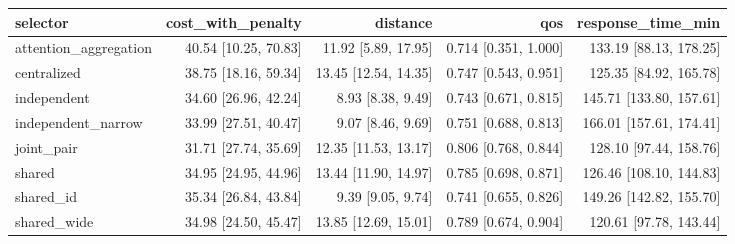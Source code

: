\begin{tabular}{lrrrr}
\toprule
selector & cost\_with\_penalty & distance & qos & response\_time\_min \\
\midrule
attention\_aggregation & 40.54 [10.25, 70.83] & 11.92 [5.89, 17.95] & 0.714 [0.351, 1.000] & 133.19 [88.13, 178.25] \\
centralized & 38.75 [18.16, 59.34] & 13.45 [12.54, 14.35] & 0.747 [0.543, 0.951] & 125.35 [84.92, 165.78] \\
independent & 34.60 [26.96, 42.24] & 8.93 [8.38, 9.49] & 0.743 [0.671, 0.815] & 145.71 [133.80, 157.61] \\
independent\_narrow & 33.99 [27.51, 40.47] & 9.07 [8.46, 9.69] & 0.751 [0.688, 0.813] & 166.01 [157.61, 174.41] \\
joint\_pair & 31.71 [27.74, 35.69] & 12.35 [11.53, 13.17] & 0.806 [0.768, 0.844] & 128.10 [97.44, 158.76] \\
shared & 34.95 [24.95, 44.96] & 13.44 [11.90, 14.97] & 0.785 [0.698, 0.871] & 126.46 [108.10, 144.83] \\
shared\_id & 35.34 [26.84, 43.84] & 9.39 [9.05, 9.74] & 0.741 [0.655, 0.826] & 149.26 [142.82, 155.70] \\
shared\_wide & 34.98 [24.50, 45.47] & 13.85 [12.69, 15.01] & 0.789 [0.674, 0.904] & 120.61 [97.78, 143.44] \\
\bottomrule
\end{tabular}
